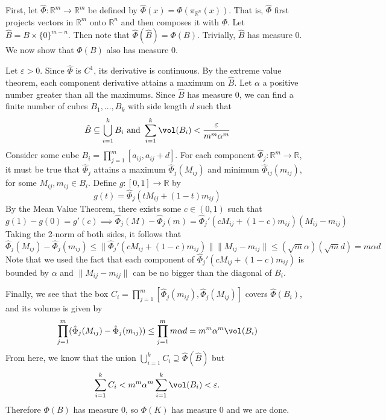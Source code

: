 \documentclass{../../../tex-setup/eh-homework}
\begin{document}
\begin{question}{34}
        First, let \(\hat{\Phi}: \mathbb{R}^m \to \mathbb{R}^m\) be defined by \(\hat{\Phi}(x) = \Phi (\pi _{\mathbb{R}^n}(x))\). That is, \(\hat{\Phi}\) first projects vectors in \(\mathbb{R}^m\) onto \(\mathbb{R}^n\) and then composes it with \(\Phi\). Let \(\hat{B} = B \times \{ 0 \}^{m-n}\). Then note that \(\hat{\Phi}(\hat{B}) = \Phi (B)\). Trivially, \(\hat{B}\) has measure 0. We now show that \(\Phi (B)\) also has measure 0.

        Let \(\varepsilon > 0\). Since \(\hat{\Phi}\) is \(C^1\), its derivative is continuous. By the extreme value theorem, each component derivative attains a maximum on \(\hat{B}\). Let \(\alpha\) a positive number greater than all the maximums. Since \(\hat{B}\) has measure 0, we can find a finite number of cubes \(B_1, ..., B_k\) with side length \(d\) such that
        \[
            \hat{B} \subseteq \bigcup_{i=1}^{k} B_i \text{ and } \sum_{i=1}^{k} \vol(B_i) < \frac{\varepsilon}{m^m \alpha^m}
        \]
        Consider some cube \(B_i = \prod_{j=1}^{m} [a_{ij}, a_{ij} + d]\). For each component \(\hat{\Phi}_j: \mathbb{R}^m \to \mathbb{R}\), it must be true that \(\hat{\Phi}_j\) attains a maximum \(\hat{\Phi}_j(M_{ij})\) and minimum \(\hat{\Phi}_{ij}(m_{ij})\), for some \(M_{ij}, m_{ij} \in B_i\). Define \(g: [0,1] \to \mathbb{R}\) by
        \[
            g(t) = \hat{\Phi}_j(t M_{ij} + (1 - t)m_{ij})
        \]
        By the Mean Value Theorem, there exists some \(c \in (0,1)\) such that
        \[
            g(1) - g(0) = g'(c) \implies \hat{\Phi}_j (M) - \hat{\Phi}_j (m) = \hat{\Phi}_j '(c M_{ij} + (1 - c)m_{ij})(M_{ij} - m_{ij})
        \]
        Taking the 2-norm of both sides, it follows that
        \[
            \hat{\Phi}_j (M_{ij}) - \hat{\Phi}_j (m_{ij}) \leq \|\hat{\Phi}_j '(c M_{ij} + (1 - c)m_{ij})\| \|M_{ij} - m_{ij}\| \leq (\sqrt{m} \alpha)(\sqrt{m}d) = m \alpha d
        \]
        Note that we used the fact that each component of \(\hat{\Phi}_j '(c M_{ij} + (1 - c)m_{ij})\) is bounded by \(\alpha\) and \(\|M_{ij} - m_{ij}\|\) can be no bigger than the diagonal of \(B_i\).

        Finally, we see that the box \(C_i = \prod_{j=1}^m [\hat{\Phi}_j(m_{ij}), \hat{\Phi}_j(M_{ij})]\) covers \(\hat{\Phi} (B_i)\), and its volume is given by
        \[
            \prod_{j=1}^m (\hat{\Phi}_j (M_{ij}) - \hat{\Phi}_j (m_{ij})) \leq \prod_{j=1}^m m \alpha d = m^m \alpha^m \vol (B_i)
        \]
        From here, we know that the union \(\bigcup_{i=1}^{k} C_i \supseteq \hat{\Phi}(\hat{B})\) but
        \[
            \sum_{i=1}^{k} C_i < m^m \alpha^m \sum_{i=1}^{k} \vol (B_i) < \varepsilon.
        \]
        Therefore \(\Phi(B)\) has measure 0, so \(\Phi (K)\) has measure 0 and we are done.
    \end{question}
\end{document}
